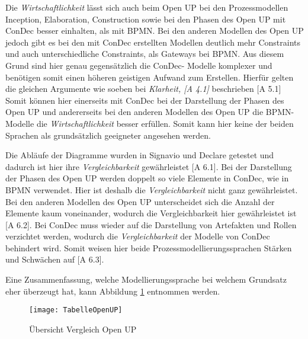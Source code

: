Die \textit{Wirtschaftlichkeit} lässt sich auch beim Open UP bei den Prozessmodellen Inception, Elaboration, Construction sowie bei den Phasen des Open UP mit ConDec besser einhalten, als mit BPMN.  \newline
Bei den anderen Modellen des Open UP jedoch gibt es bei den mit ConDec erstellten Modellen deutlich mehr Constraints und auch unterschiedliche Constraints, als  Gateways bei BPMN. Aus diesem Grund sind hier genau gegensätzlich die ConDec- Modelle komplexer und benötigen somit einen höheren geistigen Aufwand zum Erstellen. \newline
Hierfür gelten die gleichen Argumente wie soeben bei \textit{Klarheit, [A 4.1]} beschrieben [A 5.1]
Somit können hier einerseits mit ConDec bei der Darstellung der Phasen des Open UP und andererseits bei den anderen Modellen des Open UP die BPMN-Modelle die \textit{Wirtschaftlichkeit} besser erfüllen. Somit kann hier keine der beiden Sprachen als grundsätzlich geeigneter angesehen werden.\newline


Die Abläufe der Diagramme wurden in Signavio und Declare getestet und dadurch ist hier ihre \textit{Vergleichbarkeit} gewährleistet [A 6.1].\newline
Bei der Darstellung der Phasen des Open UP werden doppelt so viele Elemente in ConDec, wie in BPMN verwendet. Hier ist deshalb die \textit{Vergleichbarkeit} nicht ganz gewährleistet. Bei den anderen Modellen des Open UP unterscheidet sich die Anzahl der Elemente kaum voneinander, wodurch die Vergleichbarkeit hier gewährleistet ist [A 6.2]. \newline
Bei ConDec muss wieder auf die Darstellung von Artefakten und Rollen verzichtet werden, wodurch die \textit{Vergleichbarkeit} der Modelle von ConDec behindert wird. Somit weisen hier beide Prozessmodellierungssprachen Stärken und Schwächen auf [A 6.3].\newline

Eine Zusammenfassung, welche Modellierungssprache bei welchem Grundsatz eher überzeugt hat, kann Abbildung \ref{fig:TabelleOpenUP} entnommen werden. \newline


\begin{figure}[htp]
\begin{center}
  \texttt{[image: TabelleOpenUP]} %
  \caption{Übersicht Vergleich Open UP}
  \label{fig:TabelleOpenUP}
\end{center}
\end{figure}


